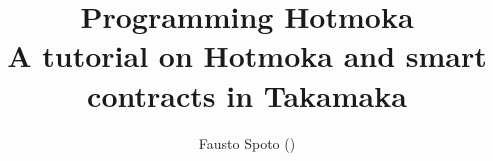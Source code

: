 \documentclass[12pt,oneside,openright]{book}
\title{Programming Hotmoka\\{\small A tutorial on Hotmoka and smart contracts in Takamaka}}
\author{Fausto Spoto (\faustoEmail{})}
\date{\today\\{\small (updated to Hotmoka \hotmokaVersion{}, Mokamint \mokamintVersion{} and Takamaka \takamakaVersion{})} \\
  \vspace*{10ex}
  \hotmokaWeb{} \\
  \vspace*{30ex}
  {\small\begin{minipage}{\textwidth*4/5}
    \begin{center}\myincludegraphics{11ex}{CC_license}\end{center}
    This document is licensed under a Creative Commons Attribution 4.0 International License.
    Its latest version is available for free online
	at \hotmokaTutorialOnline{} and in PDF at \hotmokaRepoReleases{}.
  \end{minipage}}
}
\begin{document}
\maketitle                      %


\tableofcontents                %













\begin{warpprint}   %
\cleardoublepage    %
{}
\printindex
\cleardoublepage    %
{}
\end{warpprint}

\begin{warpHTML}
\ForceHTMLPage      %
\ForceHTMLTOC       %
\printindex
\ForceHTMLPage      %
\ForceHTMLTOC       %
\end{warpHTML}


\end{document}
